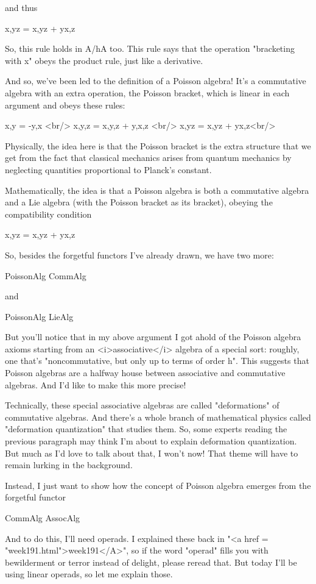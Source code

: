 and thus

{x,yz} = {x,y}z + y{x,z}

So, this rule holds in A/hA too.  This rule says that the operation
"bracketing with x" obeys the product rule, just like a
derivative.

And so, we've been led to the definition of a Poisson algebra!  It's a
commutative algebra with an extra operation, the Poisson bracket,
which is linear in each argument and obeys these rules:

{x,y} = -{y,x}  <br/>
{x,{y,z}} = {{x,y},z} + {y,{x,z}} <br/>
{x,yz} = {x,y}z + y{x,z}<br/>

Physically, the idea here is that the Poisson bracket is the extra
structure that we get from the fact that classical mechanics arises
from quantum mechanics by neglecting quantities proportional to
Planck's constant.

Mathematically, the idea is that a Poisson algebra is both a
commutative algebra and a Lie algebra (with the Poisson bracket as its
bracket), obeying the compatibility condition

{x,yz} = {x,y}z + y{x,z}

So, besides the forgetful functors I've already drawn, we have two
more:

PoissonAlg \to  CommAlg

and 

PoissonAlg \to  LieAlg

But you'll notice that in my above argument I got ahold of the Poisson
algebra axioms starting from an <i>associative</i> algebra of a
special sort: roughly, one that's "noncommutative, but only up to
terms of order h".  This suggests that Poisson algebras are a
halfway house between associative and commutative algebras.  And I'd
like to make this more precise!

Technically, these special associative algebras are called
"deformations" of commutative algebras.  And there's a whole
branch of mathematical physics called "deformation
quantization" that studies them.  So, some experts reading the
previous paragraph may think I'm about to explain deformation
quantization.  But much as I'd love to talk about that, I won't now!
That theme will have to remain lurking in the background.

Instead, I just want to show how the concept of Poisson algebra
emerges from the forgetful functor

CommAlg \to  AssocAlg

And to do this, I'll need operads.  I explained these back in "<a
href = "week191.html">week191</A>", so if the word
"operad" fills you with bewilderment or terror instead of
delight, please reread that.  But today I'll be using linear operads,
so let me explain those.

